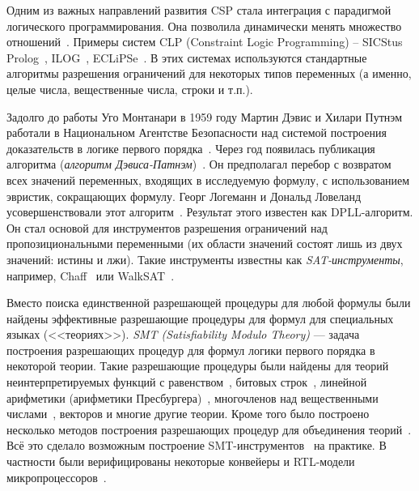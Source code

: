 Одним из важных направлений развития CSP стала интеграция с
парадигмой логического программирования. Она позволила динамически
менять множество отношений~\cite{CLPusingECLiPSe}. Примеры систем
CLP (Constraint Logic Programming) -- SICStus Prolog~\cite{SICStus},
ILOG~\cite{ILOG}, ECLiPSe~\cite{CLPusingECLiPSe}. В этих системах
используются стандартные алгоритмы разрешения ограничений для
некоторых типов переменных (а именно, целые числа, вещественные
числа, строки и т.п.).

Задолго до работы Уго Монтанари в 1959 году Мартин Дэвис и Хилари
Путнэм работали в Национальном Агентстве Безопасности над системой
построения доказательств в логике первого порядка~\cite{DPLL}. Через
год появилась публикация алгоритма (\emph{алгоритм
Дэвиса-Патнэм})~\cite{DPLL60}. Он предполагал перебор с возвратом
всех значений переменных, входящих в исследуемую формулу, с
использованием эвристик, сокращающих формулу. Георг Логеманн и
Дональд Ловеланд усовершенствовали этот алгоритм~\cite{DPLL62}.
Результат этого известен как DPLL-алгоритм. Он стал основой для
инструментов разрешения ограничений над пропозициональными
переменными (их области значений состоят лишь из двух значений:
истины и лжи). Такие инструменты известны как
\emph{SAT-инструменты}, например, Chaff~\cite{Chaff} или
WalkSAT~\cite{WalkSAT}.

Вместо поиска единственной разрешающей процедуры для любой формулы
были найдены эффективные разрешающие процедуры для формул для
специальных языках (<<теориях>>). \emph{SMT (Satisfiability Modulo
Theory)} --- задача построения разрешающих процедур для формул
логики первого порядка в некоторой теории. Такие разрешающие
процедуры были найдены для теорий неинтерпретируемых функций с
равенством~\cite{Tveretina}, битовых
строк~\cite{DecisionProcedures}, линейной арифметики (арифметики
Пресбургера)~\cite{OppenNelsonPresburger}, многочленов над
вещественными числами~\cite{DecisionRealPolynomials}, векторов и
многие другие теории. Кроме того было построено несколько методов
построения разрешающих процедур для объединения
теорий~\cite{NelsonOppenProcedure, Shostak, DTC}. Всё это сделало
возможным построение SMT-инструментов~\cite{Z3, Yices} на практике.
В частности были верифицированы некоторые конвейеры и RTL-модели
микропроцессоров~\cite{Bryant, SMT_Circuets, SMT_Pipeline,
MathSAT_RTL}.
